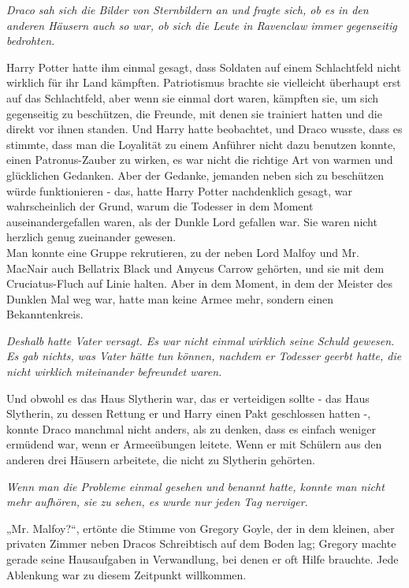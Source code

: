{\emph{Draco sah sich die Bilder von Sternbildern an und fragte sich, ob es in den anderen Häusern auch so war, ob sich die Leute in Ravenclaw immer gegenseitig bedrohten.}

Harry Potter hatte ihm einmal gesagt, dass Soldaten auf einem Schlachtfeld nicht wirklich für ihr Land kämpften. Patriotismus brachte sie vielleicht überhaupt erst auf das Schlachtfeld, aber wenn sie einmal dort waren, kämpften sie, um sich gegenseitig zu beschützen, die Freunde, mit denen sie trainiert hatten und die direkt vor ihnen standen. Und Harry hatte beobachtet, und Draco wusste, dass es stimmte, dass man die Loyalität zu einem Anführer nicht dazu benutzen konnte, einen Patronus-Zauber zu wirken, es war nicht die richtige Art von warmen und glücklichen Gedanken. Aber der Gedanke, jemanden neben sich zu beschützen würde funktionieren - das, hatte Harry Potter nachdenklich gesagt, war wahrscheinlich der Grund, warum die Todesser in dem Moment auseinandergefallen waren, als der Dunkle Lord gefallen war. Sie waren nicht herzlich genug zueinander gewesen.\\ Man konnte eine Gruppe rekrutieren, zu der neben Lord Malfoy und Mr. MacNair auch Bellatrix Black und Amycus Carrow gehörten, und sie mit dem Cruciatus-Fluch auf Linie halten. Aber in dem Moment, in dem der Meister des Dunklen Mal weg war, hatte man keine Armee mehr, sondern einen Bekanntenkreis.

\emph{Deshalb hatte Vater versagt. Es war nicht einmal wirklich seine Schuld gewesen. Es gab nichts, was Vater hätte tun können, nachdem er Todesser geerbt hatte, die nicht wirklich miteinander befreundet waren.}

Und obwohl es das Haus Slytherin war, das er verteidigen sollte - das Haus Slytherin, zu dessen Rettung er und Harry einen Pakt geschlossen hatten -, konnte Draco manchmal nicht anders, als zu denken, dass es einfach weniger ermüdend war, wenn er Armeeübungen leitete. Wenn er mit Schülern aus den anderen drei Häusern arbeitete, die nicht zu Slytherin gehörten.

\emph{Wenn man die Probleme einmal gesehen und benannt hatte, konnte man nicht mehr aufhören, sie zu sehen, es wurde nur jeden Tag nerviger}.

„Mr. Malfoy?“, ertönte die Stimme von Gregory Goyle, der in dem kleinen, aber privaten Zimmer neben Dracos Schreibtisch auf dem Boden lag; Gregory machte gerade seine Hausaufgaben in Verwandlung, bei denen er oft Hilfe brauchte. Jede Ablenkung war zu diesem Zeitpunkt willkommen.

}
